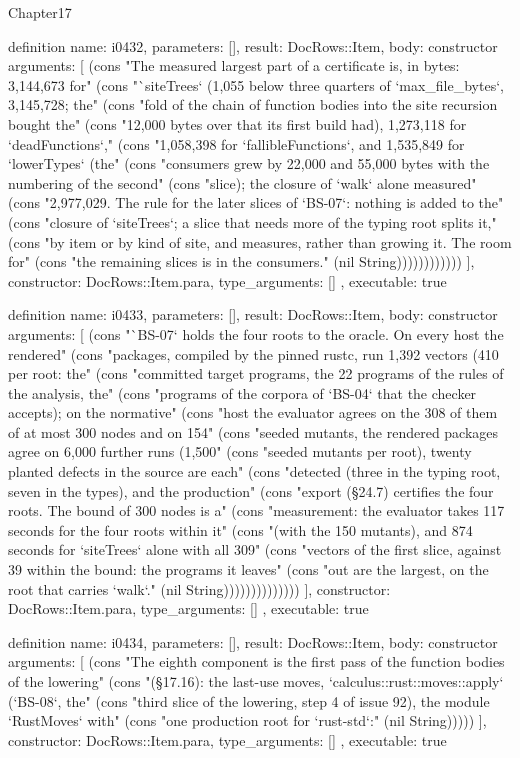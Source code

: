 \begin{lexlean}{Chapter17}
\begin{semanticmodule}
definition{
  name: i0432,
  parameters: [],
  result: DocRows::Item,
  body: constructor{
    arguments: [
      (cons "The measured largest part of a certificate is, in bytes: 3,144,673 for" (cons "`siteTrees` (1,055 below three quarters of `max_file_bytes`, 3,145,728; the" (cons "fold of the chain of function bodies into the site recursion bought the" (cons "12,000 bytes over that its first build had), 1,273,118 for `deadFunctions`," (cons "1,058,398 for `fallibleFunctions`, and 1,535,849 for `lowerTypes` (the" (cons "consumers grew by 22,000 and 55,000 bytes with the numbering of the second" (cons "slice); the closure of `walk` alone measured" (cons "2,977,029. The rule for the later slices of `BS-07`: nothing is added to the" (cons "closure of `siteTrees`; a slice that needs more of the typing root splits it," (cons "by item or by kind of site, and measures, rather than growing it. The room for" (cons "the remaining slices is in the consumers." (nil String))))))))))))
    ],
    constructor: DocRows::Item.para,
    type_arguments: []
  },
  executable: true
}

definition{
  name: i0433,
  parameters: [],
  result: DocRows::Item,
  body: constructor{
    arguments: [
      (cons "`BS-07` holds the four roots to the oracle. On every host the rendered" (cons "packages, compiled by the pinned rustc, run 1,392 vectors (410 per root: the" (cons "committed target programs, the 22 programs of the rules of the analysis, the" (cons "programs of the corpora of `BS-04` that the checker accepts); on the normative" (cons "host the evaluator agrees on the 308 of them of at most 300 nodes and on 154" (cons "seeded mutants, the rendered packages agree on 6,000 further runs (1,500" (cons "seeded mutants per root), twenty planted defects in the source are each" (cons "detected (three in the typing root, seven in the types), and the production" (cons "export (§24.7) certifies the four roots. The bound of 300 nodes is a" (cons "measurement: the evaluator takes 117 seconds for the four roots within it" (cons "(with the 150 mutants), and 874 seconds for `siteTrees` alone with all 309" (cons "vectors of the first slice, against 39 within the bound: the programs it leaves" (cons "out are the largest, on the root that carries `walk`." (nil String))))))))))))))
    ],
    constructor: DocRows::Item.para,
    type_arguments: []
  },
  executable: true
}

definition{
  name: i0434,
  parameters: [],
  result: DocRows::Item,
  body: constructor{
    arguments: [
      (cons "The eighth component is the first pass of the function bodies of the lowering" (cons "(§17.16): the last-use moves, `calculus::rust::moves::apply` (`BS-08`, the" (cons "third slice of the lowering, step 4 of issue 92), the module `RustMoves` with" (cons "one production root for `rust-std`:" (nil String)))))
    ],
    constructor: DocRows::Item.para,
    type_arguments: []
  },
  executable: true
}


\end{semanticmodule}
\end{lexlean}

